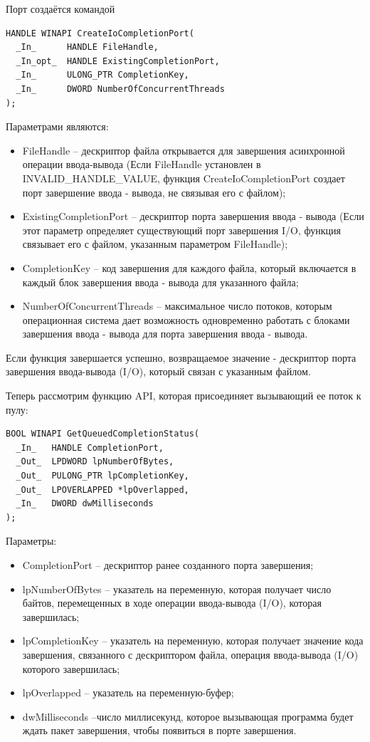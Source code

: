 \documentclass[a4paper, 12pt]{report}		%
\begin{document}
Порт создаётся командой
\begin{verbatim}
HANDLE WINAPI CreateIoCompletionPort(
  _In_      HANDLE FileHandle,
  _In_opt_  HANDLE ExistingCompletionPort,
  _In_      ULONG_PTR CompletionKey,
  _In_      DWORD NumberOfConcurrentThreads
);
\end{verbatim}

Параметрами являются:
\begin{itemize}
\item FileHandle -- дескриптор файла открывается  для завершения асинхронной операции ввода-вывода (Если FileHandle установлен в INVALID\_HANDLE\_VALUE, функция CreateIoCompletionPort создает порт завершение ввода - вывода, не связывая его с файлом);
\item ExistingCompletionPort -- дескриптор порта завершения ввода - вывода (Если этот параметр определяет существующий порт завершения I/O, функция связывает его с файлом, указанным параметром FileHandle);
\item CompletionKey -- код завершения для каждого файла, который включается в каждый блок завершения ввода - вывода для указанного файла;
\item NumberOfConcurrentThreads -- максимальное число потоков, которым операционная система дает возможность одновременно работать с блоками завершения ввода - вывода для порта завершения  ввода - вывода.
\end{itemize}

Если функция завершается успешно, возвращаемое значение - дескриптор порта завершения ввода-вывода (I/O), который связан с указанным файлом.

Теперь рассмотрим функцию API, которая присоединяет вызывающий ее поток к пулу:
\begin{verbatim}
BOOL WINAPI GetQueuedCompletionStatus(
  _In_   HANDLE CompletionPort,
  _Out_  LPDWORD lpNumberOfBytes,
  _Out_  PULONG_PTR lpCompletionKey,
  _Out_  LPOVERLAPPED *lpOverlapped,
  _In_   DWORD dwMilliseconds
);
\end{verbatim}

Параметры:
\begin{itemize}
\item CompletionPort -- дескриптор ранее созданного порта завершения;
\item lpNumberOfBytes -- указатель на переменную, которая получает число байтов, перемещенных в ходе операции ввода-вывода (I/O), которая завершилась;
\item lpCompletionKey -- указатель на переменную, которая получает значение кода завершения, связанного с дескриптором файла, операция ввода-вывода (I/O) которого завершилась;
\item lpOverlapped -- указатель на переменную-буфер;
\item dwMilliseconds --число миллисекунд, которое вызывающая программа будет ждать пакет завершения, чтобы появиться в порте завершения.
\end{itemize}
\end{document}

